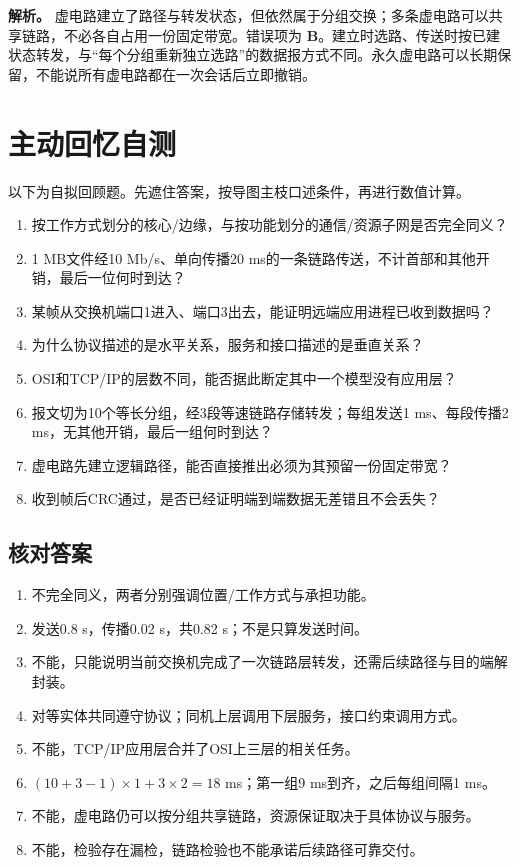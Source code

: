 \textbf{解析。} 虚电路建立了路径与转发状态，但依然属于分组交换；多条虚电路可以共享链路，不必各自占用一份固定带宽。错误项为 \textbf{B}。建立时选路、传送时按已建状态转发，与``每个分组重新独立选路''的数据报方式不同。永久虚电路可以长期保留，不能说所有虚电路都在一次会话后立即撤销。

\section{主动回忆自测}\label{CN01-review}

以下为自拟回顾题。先遮住答案，按导图主枝口述条件，再进行数值计算。

\begin{enumerate}
\def\labelenumi{\arabic{enumi}.}
\tightlist
\item
  按工作方式划分的核心/边缘，与按功能划分的通信/资源子网是否完全同义？
\item
  1 MB文件经10 Mb/s、单向传播20 ms的一条链路传送，不计首部和其他开销，最后一位何时到达？
\item
  某帧从交换机端口1进入、端口3出去，能证明远端应用进程已收到数据吗？
\item
  为什么协议描述的是水平关系，服务和接口描述的是垂直关系？
\item
  OSI和TCP/IP的层数不同，能否据此断定其中一个模型没有应用层？
\item
  报文切为10个等长分组，经3段等速链路存储转发；每组发送1 ms、每段传播2 ms，无其他开销，最后一组何时到达？
\item
  虚电路先建立逻辑路径，能否直接推出必须为其预留一份固定带宽？
\item
  收到帧后CRC通过，是否已经证明端到端数据无差错且不会丢失？
\end{enumerate}

\subsection{核对答案}\label{CN01-review-answers}

\begin{enumerate}
\def\labelenumi{\arabic{enumi}.}
\tightlist
\item
  不完全同义，两者分别强调位置/工作方式与承担功能。
\item
  发送0.8 s，传播0.02 s，共0.82 s；不是只算发送时间。
\item
  不能，只能说明当前交换机完成了一次链路层转发，还需后续路径与目的端解封装。
\item
  对等实体共同遵守协议；同机上层调用下层服务，接口约束调用方式。
\item
  不能，TCP/IP应用层合并了OSI上三层的相关任务。
\item
  \((10+3-1)\times1+3\times2=18\) ms；第一组9 ms到齐，之后每组间隔1 ms。
\item
  不能，虚电路仍可以按分组共享链路，资源保证取决于具体协议与服务。
\item
  不能，检验存在漏检，链路检验也不能承诺后续路径可靠交付。
\end{enumerate}
